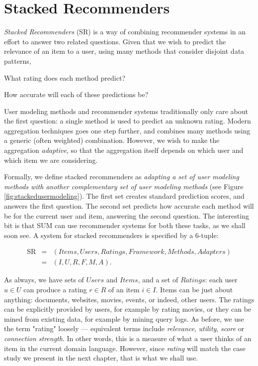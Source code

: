 \section{Stacked Recommenders}
\label{sec:usermetamodeling}

\emph{Stacked Recommenders} (SR) is a way of combining recommender systems
in an effort to answer two related questions.
Given that we wish to predict the relevance of an item to a user,
using many methods that consider disjoint data patterns,

\begin{enumerate*}
  \item What rating does each method predict?
  \item How accurate will each of these predictions be?
\end{enumerate*}

User modeling methods and recommender systems traditionally only care about the first question:
a single method is used to predict an unknown rating.
Modern aggregation techniques goes one step further, and combines many methods using a generic (often weighted) combination.
However, we wish to make the aggregation \emph{adaptive},
so that the aggregation itself depends on which user and which item we are considering.

Formally, we define stacked recommenders as \emph{adapting a set of user modeling methods
with another complementary set of user modeling methods} 
(see Figure \ref{fig:stackedusermodeling}).
The first set creates standard prediction scores, and answers the first question.
The second set predicts how accurate each method will be for the current user and item,
answering the second question.
The interesting bit is that SUM can use recommender systems for both these tasks, as we shall soon see.
A system for stacked recommenders is specified by a 6-tuple:

\begin{eqnarray*}
  \mathrm{SR} &=& (Items, Users, Ratings, Framework, Methods, Adapters)\\
               &=& (I,U,R,F,M,A).
\end{eqnarray*}
\vspace{0.2em}

\noindent
As always, we have sets of $Users$ and $Items$, 
and a set of $Ratings$: each user $u \in U$ can produce a rating $r \in R$ of an item $i \in I$.
Items can be just about anything: documents, websites, movies, events, or indeed, other users.
The ratings can be explicitly provided by users, for example by rating movies,
or they can be mined from existing data, for example by mining query logs.
As before, we use the term "rating" loosely --- equivalent terms include \emph{relevance}, \emph{utility},
\emph{score} or \emph{connection strength}. In other words, this is a measure of what a user thinks of an item
in the current domain language. However, since \emph{rating} will match the case study we present in the next chapter,
that is what we shall use. 

